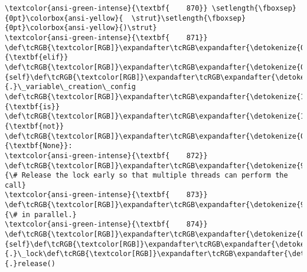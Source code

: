 \documentclass[11pt]{article}
\begin{document}
\begin{Verbatim}[commandchars=\\\{\}, frame=single, framerule=2mm, rulecolor=\color{outerrorbackground}]
\textcolor{ansi-green-intense}{\textbf{    870}} \setlength{\fboxsep}{0pt}\colorbox{ansi-yellow}{  \strut}\setlength{\fboxsep}{0pt}\colorbox{ansi-yellow}{)\strut}
\textcolor{ansi-green-intense}{\textbf{    871}} \def\tcRGB{\textcolor[RGB]}\expandafter\tcRGB\expandafter{\detokenize{0,135,0}}{\textbf{elif}} \def\tcRGB{\textcolor[RGB]}\expandafter\tcRGB\expandafter{\detokenize{0,135,0}}{self}\def\tcRGB{\textcolor[RGB]}\expandafter\tcRGB\expandafter{\detokenize{98,98,98}}{.}\_variable\_creation\_config \def\tcRGB{\textcolor[RGB]}\expandafter\tcRGB\expandafter{\detokenize{175,0,255}}{\textbf{is}} \def\tcRGB{\textcolor[RGB]}\expandafter\tcRGB\expandafter{\detokenize{175,0,255}}{\textbf{not}} \def\tcRGB{\textcolor[RGB]}\expandafter\tcRGB\expandafter{\detokenize{0,135,0}}{\textbf{None}}:
\textcolor{ansi-green-intense}{\textbf{    872}}   \def\tcRGB{\textcolor[RGB]}\expandafter\tcRGB\expandafter{\detokenize{95,135,135}}{\# Release the lock early so that multiple threads can perform the call}
\textcolor{ansi-green-intense}{\textbf{    873}}   \def\tcRGB{\textcolor[RGB]}\expandafter\tcRGB\expandafter{\detokenize{95,135,135}}{\# in parallel.}
\textcolor{ansi-green-intense}{\textbf{    874}}   \def\tcRGB{\textcolor[RGB]}\expandafter\tcRGB\expandafter{\detokenize{0,135,0}}{self}\def\tcRGB{\textcolor[RGB]}\expandafter\tcRGB\expandafter{\detokenize{98,98,98}}{.}\_lock\def\tcRGB{\textcolor[RGB]}\expandafter\tcRGB\expandafter{\detokenize{98,98,98}}{.}release()


\end{Verbatim}
\end{document}
